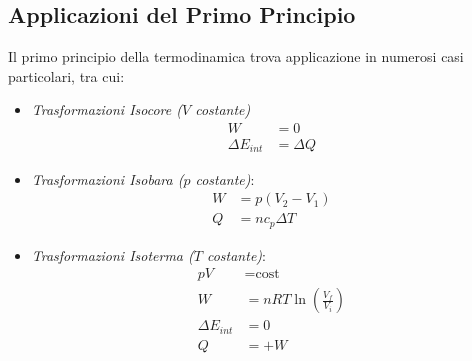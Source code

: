         \subsection{Applicazioni del Primo Principio} Il primo principio della 
        termodinamica trova applicazione in numerosi casi particolari, tra cui:
            \begin{itemize}
                \item \textit{Trasformazioni Isocore ($V$ costante)}
                    \begin{align*}
                        W &= 0 \\ 
                        \Delta E_{int} &= \Delta Q
                    \end{align*}
                \item \textit{Trasformazioni Isobara ($p$ costante)}:
                    \begin{align*}
                        W &= p(V_2-V_1) \\
                        Q &= nc_p\Delta T
                    \end{align*}
                \item \textit{Trasformazioni Isoterma ($T$ costante)}:
                    \begin{align*}
                        pV &= \text{cost} \\
                        W &= nRT\ln(\frac{V_f}{V_i}) \\
                    \Delta E_{int} &= 0\\ 
                    Q &= + W
                    \end{align*}
                    

\end{itemize}
